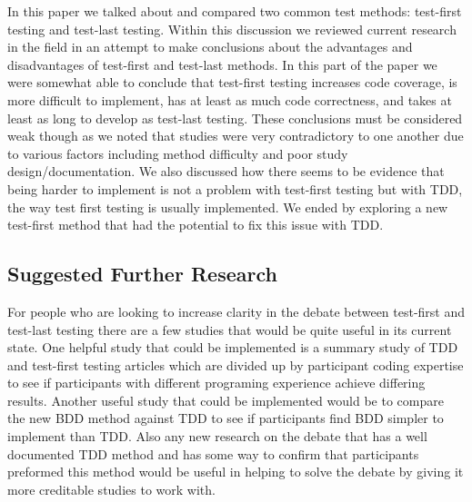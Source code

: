 \documentclass{sig-alternate}
\begin{document}
In this paper we talked about and compared two common test methods: test-first testing and test-last testing.  Within this discussion we reviewed current research in the field in an attempt to make conclusions about the advantages and disadvantages of test-first and test-last methods.  In this part of the paper we were somewhat able to conclude that test-first testing increases code coverage, is more difficult to implement, has at least as much code correctness, and takes at least as long to develop as test-last testing.  These conclusions must be considered weak though as we noted that studies were very contradictory to one another due to various factors including method difficulty and poor study design/documentation.  We also discussed how there seems to be evidence that being harder to implement is not a problem with test-first testing but with TDD, the way test first testing is usually implemented.  We ended by exploring a new test-first method that had the potential to fix this issue with TDD.

\subsection{Suggested Further Research}
For people who are looking to increase clarity in the debate between test-first and test-last testing there are a few studies that would be quite useful in its current state.  One helpful study that could be implemented is a summary study of TDD and test-first testing articles which are divided up by participant coding expertise to see if participants with different programing experience achieve differing results.  Another useful study that could be implemented would be to compare the new BDD method against TDD to see if participants find BDD simpler to implement than TDD.  Also any new research on the debate that has a well documented TDD method and has some way to confirm that participants preformed this method would be useful in helping to solve the debate by giving it more creditable studies to work with.



  
\end{document}
